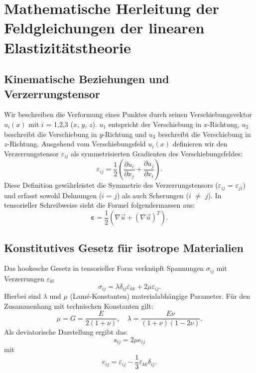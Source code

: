%
%
%
%
\section{Mathematische Herleitung der Feldgleichungen der linearen Elastizitätstheorie}
\label{elastomechanik:section:herleitung2}

\subsection{Kinematische Beziehungen und Verzerrungstensor}
Wir beschreiben die Verformung eines Punktes durch seinen Verschiebungsvektor $u_i(x)$ mit $i$ = 1,2,3 ($x$, $y$, $z$).
$u_1$ entspricht der Verschiebung in $x$-Richtung, $u_2$ beschreibt die Verschiebung in $y$-Richtung und $u_3$ beschreibt die Verschiebung in $z$-Richtung.
Ausgehend vom Verschiebungsfeld $u_i(x)$ definieren wir den Verzerrungstensor $\varepsilon_{ij}$ als symmetrisierten Gradienten des Verschiebungsfeldes:
\begin{equation*}
	\varepsilon_{ij} = 
	\frac{1}{2} \left( \frac{\partial u_i}{\partial x_j} + \frac{\partial u_j}{\partial x_i} \right).
\end{equation*}
Diese Definition gewährleistet die Symmetrie des Verzerrungstensors ($\varepsilon_{ij}$ = $\varepsilon_{ji}$) und erfasst sowohl Dehnungen ($i$ = $j$) als auch Scherungen ($i$ $\neq$ $j$).
In tensorieller Schreibweise sieht die Formel folgendermassen aus:
\begin{equation*}
	\boldsymbol{\varepsilon} = 
	\frac{1}{2} \left( \nabla \vec{u} + (\nabla \vec{u})^T \right).
\end{equation*}

\subsection{Konstitutives Gesetz für isotrope Materialien
\label{elastomechanik:math:subsection:isotrop}}
Das hookesche Gesetz in tensorieller Form verknüpft Spannungen $\sigma_{ij}$ mit Verzerrungen $\varepsilon_{kl}$
\begin{equation}
	\sigma_{ij} = 
	\lambda \delta_{ij} \varepsilon_{kk} + 2\mu \varepsilon_{ij}.
\label{elastomechanik:math:eqn:materialgesetz}
\end{equation}
Hierbei sind $\lambda$ und $\mu$ (Lamé-Konstanten) materialabhängige Parameter. Für den Zusammenhang mit technischen Konstanten gilt:
\begin{equation*}
	\mu = 
	G = 
	\frac{E}{2(1+\nu)}, \quad \lambda = 
	\frac{E \nu}{(1+\nu)(1-2\nu)}.
\end{equation*}	
Als deviatorische Darstellung ergibt das:
\begin{equation*}
	s_{ij} =
	2\mu e_{ij}
\end{equation*}
mit
\begin{equation*}
	e_{ij} = 
	\varepsilon_{ij} - \frac{1}{3} \varepsilon_{kk} \delta_{ij}.
\end{equation*}


